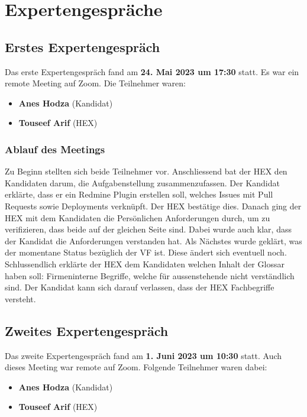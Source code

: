 \chapter{Expertengespräche}
\section{Erstes Expertengespräch}
\label{sec:first-expert-meeting}
Das erste Expertengespräch fand am \textbf{24. Mai 2023 um 17:30} statt. Es war ein remote Meeting auf Zoom.
Die Teilnehmer waren:
\begin{itemize}
  \item \textbf{Anes Hodza} (Kandidat)
  \item \textbf{Touseef Arif} (HEX)
\end{itemize}

\subsection{Ablauf des Meetings}
Zu Beginn stellten sich beide Teilnehmer vor. Anschliessend bat der HEX den Kandidaten darum, die Aufgabenstellung
zusammenzufassen. Der Kandidat erklärte, dass er ein Redmine Plugin erstellen soll, welches \gls{Issue}s mit Pull Requests
sowie Deployments verknüpft. Der HEX bestätige dies. \newline
Danach ging der HEX mit dem Kandidaten die Persönlichen Anforderungen durch, um zu verifizieren, dass beide auf der
gleichen Seite sind. Dabei wurde auch klar, dass der Kandidat die Anforderungen verstanden hat. \newline
Als Nächstes wurde geklärt, was der momentane Status bezüglich der VF ist. Diese ändert sich eventuell noch. \newline
Schlussendlich erklärte der HEX dem Kandidaten welchen Inhalt der Glossar haben soll: Firmeninterne Begriffe, welche
für aussenstehende nicht verständlich sind. Der Kandidat kann sich darauf verlassen, dass der HEX Fachbegriffe
versteht. \newline

\section{Zweites Expertengespräch}
\label{sec:second-expert-meeting}
Das zweite Expertengespräch fand am \textbf{1. Juni 2023 um 10:30} statt. Auch dieses Meeting war remote auf Zoom.
Folgende Teilnehmer waren dabei:
\begin{itemize}
  \item \textbf{Anes Hodza} (Kandidat)
  \item \textbf{Touseef Arif} (HEX)
\end{itemize}

